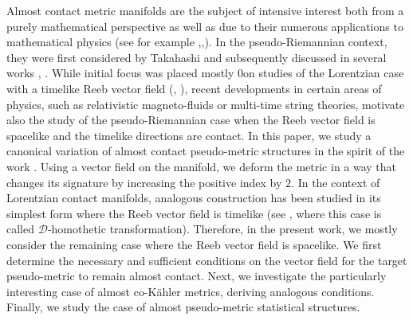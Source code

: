 \documentclass[12pt,a4paper,final]{amsart}
\numberwithin{equation}{section}
\theoremstyle{df}
\begin{document}
Almost contact metric manifolds are the subject of intensive interest both from a purely mathematical perspective as well as due to their numerous applications to mathematical physics (see for example \cite{ADDK},\cite{KKMI},\cite{PysC}). In the pseudo-Riemannian context, they were first considered by Takahashi \cite{Tak} and subsequently discussed in several works \cite{CP}, \cite{Perrone}. While initial focus was placed mostly 0on studies of the Lorentzian case with a timelike Reeb vector field (\cite{Calvaruso}, \cite{D}), recent developments in certain areas of physics, such as relativistic magneto-fluids or multi-time string theories, motivate also the study of the pseudo-Riemannian case when the Reeb vector field is spacelike and the timelike directions are contact. In this paper, we study a canonical variation of almost contact pseudo-metric structures in the spirit of the work \cite{MNO}. Using a vector field on the manifold, we deform the metric in a way that changes its signature by increasing the positive index by \(2\). In the context of Lorentzian contact manifolds, analogous construction has been studied in its simplest form where the Reeb vector field is timelike (see \cite{Calvaruso}, where this case is called \(\mathcal{D}\)-homothetic transformation). Therefore, in the present work, we mostly consider the remaining case where the Reeb vector field is spacelike. We first determine the necessary and sufficient conditions on the vector field for the target pseudo-metric to remain almost contact. Next, we investigate the particularly interesting case of almost co-K\"ahler metrics, deriving analogous conditions. Finally, we study the case of almost pseudo-metric statistical structures.
\end{document}
